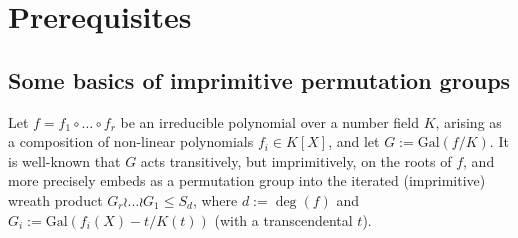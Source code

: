 \documentclass[a4paper]{amsart}
\begin{document}
  
  \section{Prerequisites}
 \subsection{Some basics of imprimitive permutation groups}
 \label{sec:prelim_wreath}
Let $f=f_1\circ \dots\circ f_r$ be an irreducible polynomial over a number field $K$, arising as a composition of non-linear polynomials $f_i\in K[X]$, and let $G:=\textrm{Gal}(f/K)$. It is well-known that $G$ acts transitively, but imprimitively, on the roots of $f$, and more precisely embeds as a permutation group into the iterated (imprimitive) wreath product $G_r\wr\dots\wr G_1 \le S_d$, where $d:=\deg(f)$ and $G_i:=\textrm{Gal}(f_i(X)-t/K(t))$  (with a transcendental $t$). 
%
\end{document}
